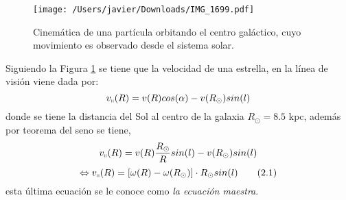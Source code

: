 \documentclass[letterpaper,oneside]{article}
\begin{document}







\begin{figure}[H]
    \centering
    \texttt{[image: /Users/javier/Downloads/IMG\_1699.pdf]}
    \caption{Cinemática de una partícula orbitando el centro galáctico, cuyo movimiento es observado desde el sistema solar.}
    \label{fig:mecanica}
\end{figure}

Siguiendo la Figura \ref{fig:mecanica} se tiene que la velocidad de una estrella, en la línea de visión viene dada por:
\begin{equation*}
v_{\shortparallel}(R)=v(R)cos(\alpha)-v(R_{\odot})sin(l)
\end{equation*}
donde se tiene la distancia del Sol al centro de la galaxia $R_{\odot}=8.5$ kpc, además por teorema del seno se tiene,
\begin{equation*}
v_{\shortparallel}(R)=v(R)\frac{R_{\odot}}{R}sin(l)-v(R_{\odot})sin(l)\\
\end{equation*}
\[
\Leftrightarrow v_{\shortparallel}(R)=[\omega(R)-\omega(R_{\odot})]	\cdot R_{\odot}sin(l) \tag{2.1} \label{eq:ec-maestra}
\]
esta última ecuación se le conoce como \textit{la ecuación maestra}.
\end{document}
